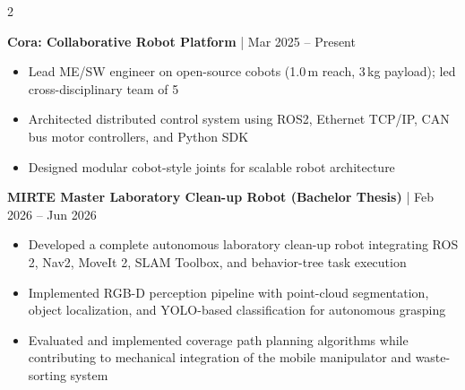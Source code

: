 \documentclass[9pt, a4paper, withhyper, normalphoto]{altacv}
\begin{document}


  \makecvheader


  \begin{paracol}{2}


    \textbf{Cora: Collaborative Robot Platform}      
    \href{https://github.com/C-O-R-A}{\faGithub} 
    \href{https://cad.onshape.com/documents/971c71e558f4d758be7c1282/w/a52d355fced062b7019a3a28/e/e9a08b2016a881ad8b69894a}{\faCube}| Mar 2025 -- Present
    \begin{itemize}
      \item Lead ME/SW engineer on open-source cobots (1.0\,m reach, 3\,kg payload); led cross-disciplinary team of 5
      \item Architected distributed control system using ROS2, Ethernet TCP/IP, CAN bus motor controllers, and Python SDK
      \item Designed modular cobot-style joints for scalable robot architecture
    \end{itemize}

    \divider

  \textbf{MIRTE Master Laboratory Clean-up Robot (Bachelor Thesis)}
  \href{https://github.com/matt-rbt/Mirte_Lab_Clean}{\faGithub}
  \href{https://matt-rbt.github.io/Lab-Cleanup-Robot-using-the-Mirte-Master-Platform/}{\faCloud}
  | Feb 2026 -- Jun 2026
  \begin{itemize}
      \item Developed a complete autonomous laboratory clean-up robot integrating ROS 2, Nav2, MoveIt 2, SLAM Toolbox, and behavior-tree task execution
      \item Implemented RGB-D perception pipeline with point-cloud segmentation, object localization, and YOLO-based classification for autonomous grasping
      \item Evaluated and implemented coverage path planning algorithms while contributing to mechanical integration of the mobile manipulator and waste-sorting system
  \end{itemize}



\end{paracol}
\end{document}
